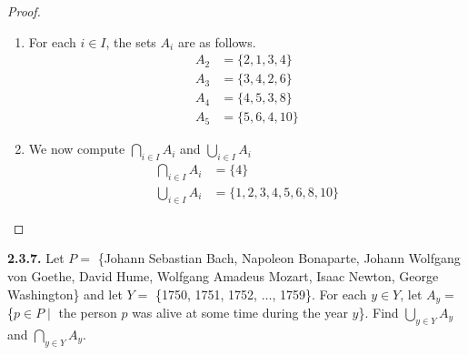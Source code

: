 \documentclass[12pt]{amsart}
\newenvironment{statement}[1]{\smallskip\noindent\color[rgb]{.6627, .3529, .6314} {\bf #1.}}{}
\theoremstyle{definition}
\theoremstyle{remark}
\begin{document}
\begin{proof}
\hfill
\begin{enumerate}
	\item For each $i \in I$, the sets $A_i$ are as follows.
	\begin{align*}
		A_2 &= \{ 2, 1, 3, 4 \} \\
		A_3 &= \{ 3, 4, 2, 6 \} \\
		A_4 &= \{ 4, 5, 3, 8 \} \\
		A_5 &= \{ 5, 6, 4, 10 \}
	\end{align*}
	
	\item We now compute $\bigcap_{i \in I} A_i$ and $\bigcup_{i \in I} A_i$
	\begin{align*}
		\bigcap_{i \in I} A_i &= \{ 4 \} \\
		\bigcup_{i \in I} A_i &= \{ 1, 2, 3, 4, 5, 6, 8, 10 \}
	\end{align*}
\end{enumerate}
\end{proof}


\begin{statement}{2.3.7}
Let $P =$ \{Johann Sebastian Bach, Napoleon Bonaparte, Johann Wolfgang von Goethe,
David Hume, Wolfgang Amadeus Mozart, Isaac Newton, George Washington\}
and let $Y =$ \{1750, 1751, 1752, $\dots$, 1759\}.
For each $y \in Y$, let $A_y =$ 
\{$p \in P \mid$ the person $p$ was alive at some time during the year $y$\}.
Find $\bigcup_{y \in Y} A_y$ and $\bigcap_{y \in Y} A_y$.
\end{statement}
\end{document}
